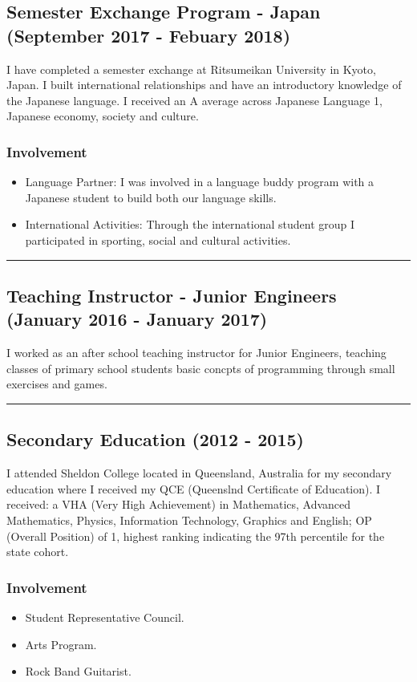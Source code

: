 \subsection*{Semester Exchange Program - Japan (September 2017 - Febuary 2018)}
I have completed a semester exchange at Ritsumeikan University in Kyoto, Japan. I built international relationships and have an introductory knowledge of the Japanese language. I received an A average across Japanese Language 1, Japanese economy, society and culture.

\subsubsection*{Involvement}
\begin{itemize}
  \setlength\itemsep{0.1em}
  \item Language Partner: I was involved in a language buddy program with a Japanese student to build both our language skills.
  \item International Activities: Through the international student group I participated in sporting, social and cultural activities.
\end{itemize}

\noindent\rule{\textwidth}{0.5pt}

\subsection*{Teaching Instructor - Junior Engineers (January 2016 - January 2017)}

I worked as an after school teaching instructor for Junior Engineers, teaching classes of primary school students basic concpts of programming through small exercises and games.

\noindent\rule{\textwidth}{0.5pt}

\subsection*{Secondary Education (2012 - 2015)}

I attended Sheldon College located in Queensland, Australia for my secondary education where I received my QCE (Queenslnd Certificate of Education). I received: a VHA (Very High Achievement) in Mathematics, Advanced Mathematics, Physics, Information Technology, Graphics and English; OP (Overall Position) of 1, highest ranking indicating the 97th percentile for the state cohort.

\subsubsection*{Involvement}

\begin{itemize}
  \setlength\itemsep{0.1em}
  \item Student Representative Council.
  \item Arts Program.
  \item Rock Band Guitarist.
\end{itemize}

